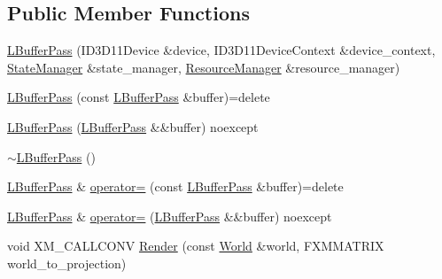 \subsection*{Public Member Functions}
\begin{DoxyCompactItemize}
\item 
\mbox{\hyperlink{classmage_1_1rendering_1_1_l_buffer_pass_a5462eea6f50ed0371185584442d1d21e}{L\+Buffer\+Pass}} (I\+D3\+D11\+Device \&device, I\+D3\+D11\+Device\+Context \&device\+\_\+context, \mbox{\hyperlink{classmage_1_1rendering_1_1_state_manager}{State\+Manager}} \&state\+\_\+manager, \mbox{\hyperlink{classmage_1_1rendering_1_1_resource_manager}{Resource\+Manager}} \&resource\+\_\+manager)
\item 
\mbox{\hyperlink{classmage_1_1rendering_1_1_l_buffer_pass_a575a6e93e446b4d9a0af33844dce0035}{L\+Buffer\+Pass}} (const \mbox{\hyperlink{classmage_1_1rendering_1_1_l_buffer_pass}{L\+Buffer\+Pass}} \&buffer)=delete
\item 
\mbox{\hyperlink{classmage_1_1rendering_1_1_l_buffer_pass_a708f765ebb9416b9e9258f78c926331e}{L\+Buffer\+Pass}} (\mbox{\hyperlink{classmage_1_1rendering_1_1_l_buffer_pass}{L\+Buffer\+Pass}} \&\&buffer) noexcept
\item 
\mbox{\hyperlink{classmage_1_1rendering_1_1_l_buffer_pass_a91261b9de58ca001a4e78cc1dd2c1f4b}{$\sim$\+L\+Buffer\+Pass}} ()
\item 
\mbox{\hyperlink{classmage_1_1rendering_1_1_l_buffer_pass}{L\+Buffer\+Pass}} \& \mbox{\hyperlink{classmage_1_1rendering_1_1_l_buffer_pass_a14814e64f1e99f3144944bea07932a20}{operator=}} (const \mbox{\hyperlink{classmage_1_1rendering_1_1_l_buffer_pass}{L\+Buffer\+Pass}} \&buffer)=delete
\item 
\mbox{\hyperlink{classmage_1_1rendering_1_1_l_buffer_pass}{L\+Buffer\+Pass}} \& \mbox{\hyperlink{classmage_1_1rendering_1_1_l_buffer_pass_aeab4dadf9d131fbfaadb28acfde5c575}{operator=}} (\mbox{\hyperlink{classmage_1_1rendering_1_1_l_buffer_pass}{L\+Buffer\+Pass}} \&\&buffer) noexcept
\item 
void X\+M\+\_\+\+C\+A\+L\+L\+C\+O\+NV \mbox{\hyperlink{classmage_1_1rendering_1_1_l_buffer_pass_a21f63364edbb794e1a70823350e44601}{Render}} (const \mbox{\hyperlink{classmage_1_1rendering_1_1_world}{World}} \&world, F\+X\+M\+M\+A\+T\+R\+IX world\+\_\+to\+\_\+projection)
\end{DoxyCompactItemize}
